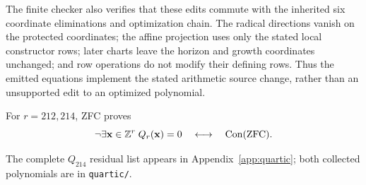 The finite checker also verifies that these edits commute with
the inherited six coordinate eliminations and optimization chain.
The radical directions vanish on the protected coordinates;
the affine projection uses only the stated local constructor
rows; later charts leave the horizon and growth coordinates
unchanged; and row operations do not modify their defining rows.
Thus the emitted equations implement the stated arithmetic
source change, rather than an unsupported edit to an optimized
polynomial.

\begin{corollary}
For $r=212,214$, ZFC proves
\[
 \neg\exists\mathbf x\in\mathbb Z^r\;Q_r(\mathbf x)=0
 \quad\longleftrightarrow\quad\operatorname{Con}(\mathrm{ZFC}).
\]
\end{corollary}
The complete $Q_{214}$ residual list appears in
Appendix~\ref{app:quartic}; both collected polynomials are in
\texttt{quartic/}.
